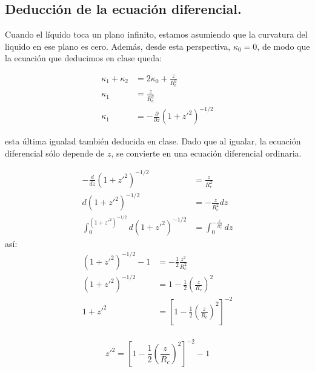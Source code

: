 \subsection{Deducción de la ecuación diferencial.}
    Cuando el líquido toca un plano infinito, estamos asumiendo que la curvatura del liquido en ese plano es cero. Además, desde esta perspectiva, $\kappa_0 = 0$, de modo que la ecuación que deducimos en clase queda:

    \begin{align*}
        \kappa_1 + \kappa_2 &= 2\kappa_0 + \frac{z}{R_c^2}\\
        \kappa_1  &= \frac{z}{R_c^2} \\
        \kappa_1 &= - \frac{\partial}{\partial z} (1 + z'^2)^{-1/2}
    \end{align*}

    esta última igualad también deducida en clase. Dado que al igualar, la ecuación diferencial sólo depende de $z$, se convierte en una ecuación diferencial ordinaria.

    \begin{align*}
        -\frac{d}{dz}(1 + z'^2)^{-1/2} &= \frac{z}{R_c^2} \\
        d(1 + z'^2)^{-1/2} &= -\frac{z}{R_c^2} dz \\
        \int_{0}^{(1+z'^2)^{-1/2}} d(1 + z'^2)^{-1/2} &= \int_{0}^{-\frac{z}{R_c^2}} dz 
    \end{align*}
    así:
    \begin{align*}
        (1 + z'^2)^{-1/2} - 1 &= -\frac{1}{2} \frac{z^2}{R_c^2} \\
        (1 + z'^2)^{-1/2} &= 1 -\frac{1}{2} \left(\frac{z}{R_c}\right)^2 \\
        1 + z'^2 &= \left[ 1 -\frac{1}{2} \left(\frac{z}{R_c}\right)^2 \right]^{-2} \\
    \end{align*}

    \begin{equation}
        \boxed{z'^2 = \left[ 1 -\frac{1}{2} \left(\frac{z}{R_c}\right)^2 \right]^{-2} - 1 }
    \end{equation}